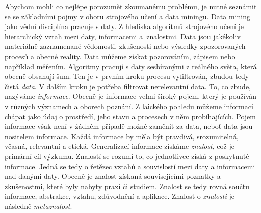 \documentclass[12pt]{article}
\begin{document}
Abychom mohli co nejlépe porozumět zkoumanému problému, je nutné seznámit se se základními pojmy v oboru strojového učení a data miningu. 
\newline 
\indent Data mining jako vědní disciplína pracuje s daty. Z hlediska algoritmů strojového učení je hierarchický vztah mezi daty, informacemi a~znalostmi. Data jsou jakékoliv materiálně zaznamenané vědomosti, zkušenosti nebo výsledky
zpozorovaných procesů a obecné reality. Data můžeme získat pozorováním, zápisem nebo
například měřením. \citep{gill} 
\newline 
\indent
Algoritmy pracují s daty sesbíranými z reálného světa, která obecně obsahují šum. Ten je v prvním kroku procesu vyfiltrován, zbudou tedy čistá \textit{data}. V dalším kroku je potřeba filtrovat nerelevantní data. To, co zbude, nazýváme \textit{informace}. 
\newline 
\indent
Obecně je informace velmi široký pojem, který je používán v různých
významech a oborech poznání. Z laického pohledu můžeme informaci chápat jako
údaj o prostředí, jeho stavu a procesech v něm probíhajících. Pojem informace však
není v žádném případě možné zaměnit za data, neboť data jsou nositelem informace.
Každá informace by měla být pravdivá, srozumitelná, včasná, relevantní
a etická. \citep{gala} 
\newline 
\indent
Generalizací informace získáme \textit{znalost}, což je primární cíl výzkumu. Znalostí se rozumí to, co jednotlivec získá z poskytnuté informace. Jedná se tedy
o řetězec vztahů a souvislostí mezi daty a informacemi nad danými daty.  Obecně je
znalost získaná souvisejícími poznatky a zkušenostmi, které byly nabyty praxí či
studiem. Znalost se tedy rovná součtu informace, abstrakce, vztahu, zdůvodnění
a aplikace. \citep{bures} 
\newline 
\indent
Znalost o \textit{znalosti} je následně \textit{metaznalost}. 
\end{document}
